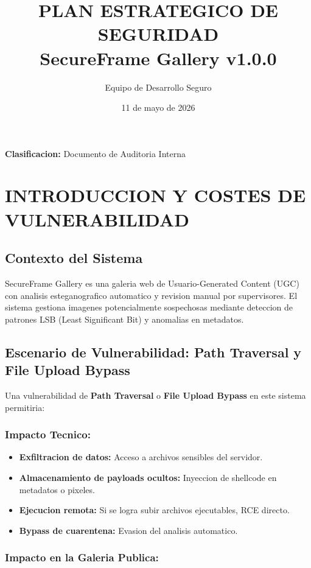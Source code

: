 \documentclass[12pt,a4paper]{article}
\title{\textbf{PLAN ESTRATEGICO DE SEGURIDAD} \\ SecureFrame Gallery v1.0.0}
\author{Equipo de Desarrollo Seguro}
\date{11 de mayo de 2026}
\begin{document}
\maketitle

\noindent\textbf{Clasificacion:} Documento de Auditoria Interna

\newpage
\tableofcontents
\newpage

\section{INTRODUCCION Y COSTES DE VULNERABILIDAD}

\subsection{Contexto del Sistema}

SecureFrame Gallery es una galeria web de Usuario-Generated Content (UGC) con analisis esteganografico automatico y revision manual por supervisores. El sistema gestiona imagenes potencialmente sospechosas mediante deteccion de patrones LSB (Least Significant Bit) y anomalias en metadatos.

\subsection{Escenario de Vulnerabilidad: Path Traversal y File Upload Bypass}

Una vulnerabilidad de \textbf{Path Traversal} o \textbf{File Upload Bypass} en este sistema permitiria:

\subsubsection{Impacto Tecnico:}

\begin{itemize}
    \item \textbf{Exfiltracion de datos:} Acceso a archivos sensibles del servidor.
    \item \textbf{Almacenamiento de payloads ocultos:} Inyeccion de shellcode en metadatos o pixeles.
    \item \textbf{Ejecucion remota:} Si se logra subir archivos ejecutables, RCE directo.
    \item \textbf{Bypass de cuarentena:} Evasion del analisis automatico.
\end{itemize}

\subsubsection{Impacto en la Galeria Publica:}
\end{document}
